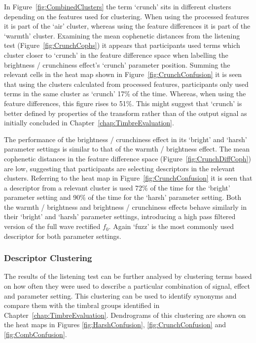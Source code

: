 			In Figure~\ref{fig:CombinedClusters} the term `crunch' sits in different clusters depending on the
			features used for clustering. When using the processed features it is part of the `air' cluster,
			whereas using the feature differences it is part of the `warmth' cluster. Examining the mean
			cophenetic distances from the listening test (Figure~\ref{fig:CrunchCophs}) it appears that
			participants used terms which cluster closer to `crunch' in the feature difference space when
			labelling the brightness / crunchiness effect's `crunch' parameter position. Summing the relevant
			cells in the heat map shown in Figure~\ref{fig:CrunchConfusion} it is seen that using the clusters
			calculated from processed features, participants only used terms in the same cluster as `crunch'
			17\% of the time. Whereas, when using the feature differences, this figure rises to 51\%. This
			might suggest that `crunch' is better defined by properties of the transform rather than of the
			output signal as initially concluded in Chapter~\ref{chap:TimbreEvaluation}.

			The performance of the brightness / crunchiness effect in its `bright' and `harsh' parameter
			settings is similar to that of the warmth / brightness effect. The mean cophenetic distances in the
			feature difference space (Figure~\ref{fig:CrunchDiffCoph}) are low, suggesting that participants
			are selecting descriptors in the relevant clusters. Referring to the heat map in
			Figure~\ref{fig:CrunchConfusion} it is seen that a descriptor from a relevant cluster is used 72\%
			of the time for the `bright' parameter setting and 90\% of the time for the `harsh' parameter
			setting.  Both the warmth / brightness and brightness / crunchiness effects behave similarly in
			their `bright' and `harsh' parameter settings, introducing a high pass filtered version of the full
			wave rectified $f_{0}$. Again `fuzz' is the most commonly used descriptor for both parameter
			settings.

		\subsubsection*{Descriptor Clustering}
			The results of the listening test can be further analysed by clustering terms based on how often
			they were used to describe a particular combination of signal, effect and parameter setting. This
			clustering can be used to identify synonyms and compare them with the timbral groups identified in
			Chapter~\ref{chap:TimbreEvaluation}. Dendrograms of this clustering are shown on the heat maps in
			Figures \ref{fig:HarshConfusion}, \ref{fig:CrunchConfusion} and \ref{fig:CombConfusion}.

